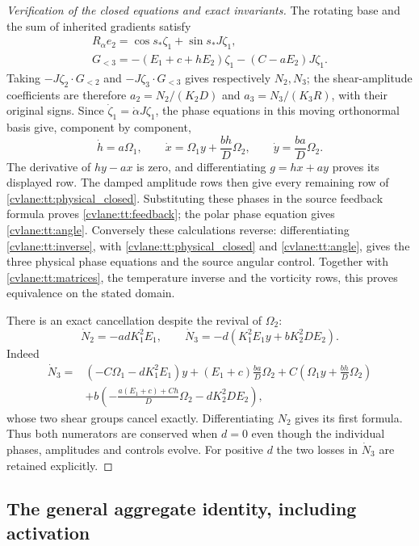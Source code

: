 \begin{proof}[Verification of the closed equations and exact invariants]
The rotating base and the sum of inherited gradients satisfy
\begin{gather*}
 R_\alpha e_2=\cos s_*\zeta_1+\sin s_*J\zeta_1,\\
 G_{<3}=-(E_1+c+hE_2)\zeta_1-(C-aE_2)J\zeta_1.
\end{gather*}
Taking $-J\zeta_2\cdot G_{<2}$ and
$-J\zeta_3\cdot G_{<3}$ gives respectively $N_2,N_3$;
the shear-amplitude coefficients are therefore
$a_2=N_2/(K_2D)$ and $a_3=N_3/(K_3R)$, with their original
signs. Since $\dot\zeta_1=\dot\alpha J\zeta_1$, the phase
equations in this moving orthonormal basis give, component by component,
\[
 \dot h=a\Omega_1,\qquad
 \dot x=\Omega_1y+\frac{bh}{D}\Omega_2,\qquad
 \dot y=\frac{ba}{D}\Omega_2.
\]
The derivative of $hy-ax$ is zero, and differentiating $g=hx+ay$
proves its displayed row. The damped amplitude rows then give every
remaining row of \eqref{cvlane:tt:physical_closed}. Substituting these phases
in the source feedback formula proves \eqref{cvlane:tt:feedback}; the polar
phase equation gives \eqref{cvlane:tt:angle}. Conversely these calculations
reverse: differentiating \eqref{cvlane:tt:inverse}, with
\eqref{cvlane:tt:physical_closed} and \eqref{cvlane:tt:angle}, gives the three
physical phase equations and the source angular control. Together with
\eqref{cvlane:tt:matrices}, the temperature inverse and the vorticity rows,
this proves equivalence on the stated domain.

There is an exact cancellation despite the revival of $\Omega_2$:
\begin{equation}\label{cvlane:tt:numerator_derivatives}
 \dot N_2=-adK_1^2E_1,\qquad
 \dot N_3=-d(K_1^2E_1y+bK_2^2DE_2).
\end{equation}
Indeed
\[
\begin{aligned}
 \dot N_3={}&(-C\Omega_1-dK_1^2E_1)y
 +(E_1+c)\frac{ba}{D}\Omega_2
 +C\left(\Omega_1y+\frac{bh}{D}\Omega_2\right)\\
 &+b\left(-\frac{a(E_1+c)+Ch}{D}\Omega_2-dK_2^2DE_2\right),
\end{aligned}
\]
whose two shear groups cancel exactly. Differentiating $N_2$ gives
its first formula. Thus both numerators are conserved when $d=0$
even though the individual phases, amplitudes and controls evolve.
For positive $d$ the two losses in $\dot N_3$ are retained explicitly.
\end{proof}

\subsection{The general aggregate identity, including activation}

